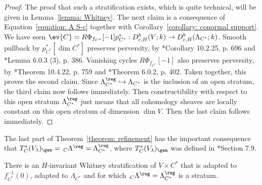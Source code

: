 \documentclass[11pt,letterpaper]{amsart}
\numberwithin{equation}{section}
\begin{document}
\begin{proof}
The proof that such a stratification exists, which is quite technical, will be given in Lemma~\ref{lemma: Whitney}. 
The next claim is a consequence of Equation~\eqref{equation: A S-c} together with Corollary~\ref{corollary: conormal support}.
We have seen $\ev{C} = R\Phi_{f_{C^*}}[-1]p_{C^*}^* : D^b_{c,H}(V;k) \to D^b_{c,H}(\Lambda_{C^*};k)$.
    Smooth pullback by $p_{C^*}^*[\dim C^*]$ preserves perversity, by \cite{MS22}*{Corollary 10.2.25, p. 696} and \cite{Sch03}*{Lemma 6.0.3 (3), p. 386}.
    Vanishing cycles $R\Phi_{f_{C^*}}[-1]$ also preserves perversity, by \cite{MS22}*{Theorem 10.4.22, p. 759} and \cite{Sch03}*{Theorem 6.0.2, p. 402}. Taken together, this proves the second claim.
Since $\Lambda_{C^*}^\reg \hookrightarrow \Lambda_{C^*}$ is the inclusion of an open stratum, the third claim now follows immediately. 
Then constructibility with respect to this open stratum $\Lambda_{C^*}^\reg$ just means that all cohomology sheaves are locally constant on this open stratum of dimension $\dim V$.
Then the last claim follows immediately.
\end{proof}

\begin{remark}
    The last part of Theorem~\ref{theorem: refinement} has the important consequence that $T^*_C(V_\lambda)_\gen = \,_{C}\Lambda^\reg = \Lambda^\reg_{C^*}$, where $T^*_C(V_\lambda)_\gen$ was defined in \cite{CFMMX22}*{Section 7.9}.
\end{remark}

\begin{lemma}\label{lemma: Whitney}
There is an $H$-invariant Whitney stratification of $V\times C^*$ that is adapted to $f_{C^*}^{-1}(0)$, adapted to $\Lambda_{C^*}$ and for which $\,_{C}\Lambda^\reg =\Lambda_{C^*}^\reg$ is a stratum.
\end{lemma}
\end{document}
